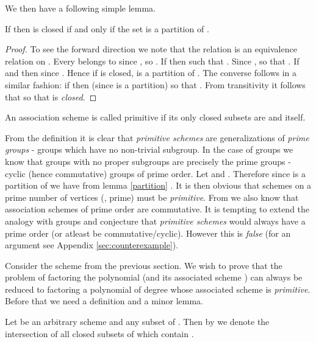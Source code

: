  	We then have a following simple lemma.

	\begin{lemma}\label{partition}
		If  then  is closed if and only if the set  is a partition of .
	\end{lemma}

	\begin{proof}
		To see the forward direction we note that the relation  is an equivalence relation on . Every  belongs to  since , so . If  then  such 
		that . Since ,  so that . If  and  then  since . Hence if  is closed,  is a partition of .
		The converse follows in a similar fashion: if  then  (since  is a partition) so that . From transitivity it follows that  so that  is \emph{closed}.
	\end{proof}

	\begin{definition}\label{primitivescheme}
		An association scheme  is called primitive if its only closed subsets are  and  itself.
        \end{definition}

	
	From the definition it is clear that \emph{primitive schemes} are generalizations of \emph{prime groups} - groups which have no non-trivial subgroup. In the case of groups we know that groups with no proper subgroups
	are precisely the prime groups - cyclic (hence commutative) groups of prime order.	
	Let  and . Therefore since  is a partition of  we have from lemma \ref{partition}
	. It is then obvious that schemes on a prime number of vertices (,  prime) must be \emph{primitive}. From \cite{Hanaki:2006} we also know that association schemes of prime order are commutative. It is 
	tempting to extend the analogy with groups and conjecture that \emph{primitive schemes} would always have a prime order (or atleast be commutative/cyclic). However this is \emph{false} (for an argument see Appendix
	\ref{sec:counterexample}).
	
	Consider the scheme  from the previous section. We wish to prove that the
	problem of factoring the polynomial  (and its associated scheme ) can always be reduced to factoring a polynomial of degree  whose associated scheme is \emph{primitive}. Before that we
	need a definition and a minor lemma.

 	\begin{definition}
		Let  be an arbitrary scheme and  any subset of . Then by  we denote the intersection of all closed subsets of  which contain .
	\end{definition}

